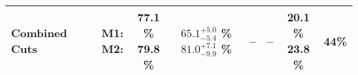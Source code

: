 \begin{tabular}{|>{\raggedright}m{3cm}|m{6cm}|c c c|c c|c|c|}
  Combined Cuts &  & \makecell{M1: \\ M2:} & \makecell{77.1 \% \\ 79.8 \%} & \makecell{$65.1^{+5.0}_{-5.4}$ \% \\ $81.0^{+7.1}_{-9.9}$ \%} & -- & -- & \makecell{20.1 \% \\ 23.8 \%} & 44\% \\
\hline
\end{tabular}
